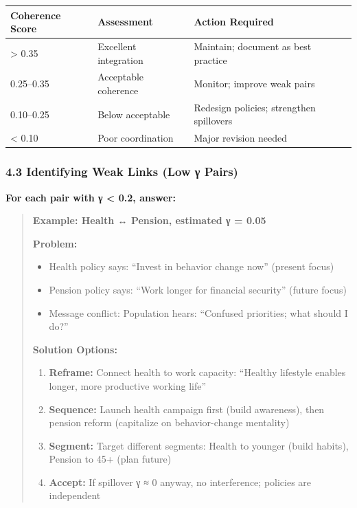 \begin{center}
\begin{tabular}{@{}lll@{}}
\toprule
\textbf{Coherence Score} & \textbf{Assessment} & \textbf{Action Required} \\
\midrule
> 0.35 & Excellent integration & Maintain; document as best practice \\
0.25–0.35 & Acceptable coherence & Monitor; improve weak pairs \\
0.10–0.25 & Below acceptable & Redesign policies; strengthen spillovers \\
< 0.10 & Poor coordination & Major revision needed \\
\midrule
\end{tabular}
\end{center}

\subsubsection*{4.3 Identifying Weak Links (Low γ Pairs)}

\textbf{For each pair with γ < 0.2, answer:}

\begin{quote}
\textbf{Example: Health ↔ Pension, estimated γ = 0.05}

\textbf{Problem:}
\begin{itemize}[nosep]
\item Health policy says: ``Invest in behavior change now'' (present focus)
\item Pension policy says: ``Work longer for financial security'' (future focus)
\item Message conflict: Population hears: ``Confused priorities; what should I do?''
\end{itemize}

\textbf{Solution Options:}
\begin{enumerate}
\item \textbf{Reframe:} Connect health to work capacity: ``Healthy lifestyle enables longer, more productive working life''
\item \textbf{Sequence:} Launch health campaign first (build awareness), then pension reform (capitalize on behavior-change mentality)
\item \textbf{Segment:} Target different segments: Health to younger (build habits), Pension to 45+ (plan future)
\item \textbf{Accept:} If spillover γ ≈ 0 anyway, no interference; policies are independent
\end{enumerate}
\end{quote}

